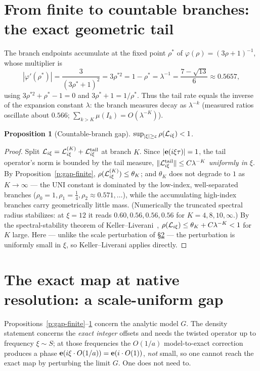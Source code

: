 \documentclass[11pt]{article}
\newtheorem{proposition}{Proposition}\newtheorem{corollary}{Corollary}
\theoremstyle{definition}\newtheorem{definition}{Definition}
\theoremstyle{remark}\newtheorem{remark}{Remark}
\begin{document}
\section{From finite to countable branches: the exact geometric tail}
\label{sec:tail}
The branch endpoints accumulate at the fixed point $\rho^\ast$ of
$\varphi(\rho)=(3\rho+1)^{-1}$, whose multiplier is
\begin{equation}\label{eq:tailrate}
|\varphi'(\rho^\ast)|=\frac{3}{(3\rho^\ast+1)^2}=3\rho^{\ast2}=1-\rho^\ast
=\lambda^{-1}=\frac{7-\sqrt{13}}{6}\approx0.5657,
\end{equation}
using $3\rho^{\ast2}+\rho^\ast-1=0$ and $3\rho^\ast+1=1/\rho^\ast$. Thus the
tail rate equals the inverse of the expansion constant $\lambda$: the branch
measures decay as $\lambda^{-k}$ (measured ratios oscillate about $0.566$;
$\sum_{k>K}\mu(I_k)=O(\lambda^{-K})$).

\begin{proposition}[Countable-branch gap]\label{p:gap-countable}
$\sup_{|\xi|\ge\varepsilon}\rho(\mathcal L_{i\xi})<1$.
\end{proposition}
\begin{proof}
Split $\mathcal L_{i\xi}=\mathcal L^{(K)}_{i\xi}+\mathcal L^{\mathrm{tail}}_{i\xi}$ at branch $K$.
Since $|\mathbf e(i\xi\tau)|=1$, the tail operator's norm is bounded by the tail
measure, $\|\mathcal L^{\mathrm{tail}}_{i\xi}\|\le C\lambda^{-K}$ \emph{uniformly in
$\xi$}. By Proposition~\ref{p:gap-finite}, $\rho(\mathcal L^{(K)}_{i\xi})\le\theta_K$;
and $\theta_K$ does not degrade to $1$ as $K\to\infty$ --- the UNI constant is
dominated by the low-index, well-separated branches ($\rho_0=1,\rho_1=\tfrac14,
\rho_2\approx0.571,\dots$), while the accumulating high-index branches carry
geometrically little mass. (Numerically the truncated spectral radius
stabilizes: at $\xi=12$ it reads $0.60,0.56,0.56,0.56$ for $K=4,8,10,\infty$.)
By the spectral-stability theorem of Keller--Liverani~\cite{KellerLiverani1999},
$\rho(\mathcal L_{i\xi})\le\theta_K+C\lambda^{-K}<1$ for $K$ large. Here --- unlike the
scale perturbation of \S\ref{sec:scale} --- the perturbation is uniformly small
in $\xi$, so Keller--Liverani applies directly.
\end{proof}

\section{The exact map at native resolution: a scale-uniform gap}
\label{sec:scale}
Propositions~\ref{p:gap-finite}--\ref{p:gap-countable} concern the analytic
model $G$. The density statement concerns the \emph{exact integer} offsets and
needs the twisted operator up to frequency $\xi\sim S$; at those frequencies the
$O(1/a)$ model-to-exact correction produces a phase $\mathbf e(i\xi\cdot O(1/a))=
\mathbf e(i\cdot O(1))$, \emph{not} small, so one cannot reach the exact map by
perturbing the limit $G$. One does not need to.
\end{document}
